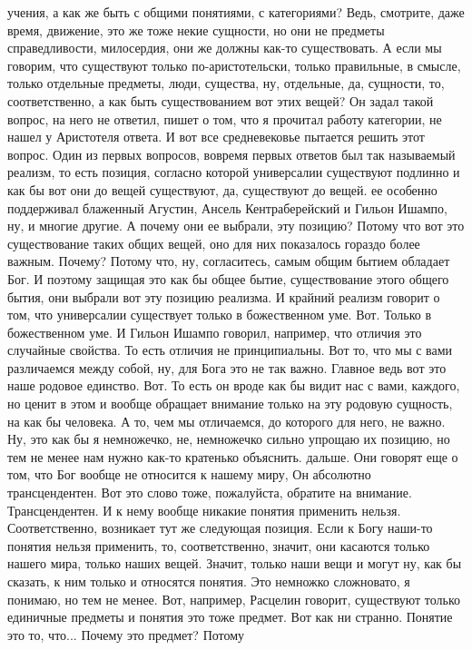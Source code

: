 учения, а как же быть с общими понятиями, с категориями? Ведь, смотрите, даже
время, движение, это же тоже некие сущности, но они не предметы справедливости,
милосердия, они же должны как-то существовать. А если мы говорим, что существуют
только по-аристотельски, только правильные, в смысле, только отдельные предметы,
люди, существа, ну, отдельные, да, сущности, то, соответственно, а как быть
существованием вот этих вещей? Он задал такой вопрос, на него не ответил, пишет
о том, что я прочитал работу категории, не нашел у Аристотеля ответа. И вот все
средневековье пытается решить этот вопрос. Один из первых вопросов, вовремя
первых ответов был так называемый реализм, то есть позиция, согласно которой
универсалии существуют подлинно и как бы вот они до вещей существуют, да,
существуют до вещей. ее особенно поддерживал блаженный Агустин, Ансель
Кентраберейский и Гильон Ишампо, ну, и многие другие. А почему они ее выбрали,
эту позицию? Потому что вот это существование таких общих вещей, оно для них
показалось гораздо более важным. Почему? Потому что, ну, согласитесь, самым
общим бытием обладает Бог. И поэтому защищая это как бы общее бытие,
существование этого общего бытия, они выбрали вот эту позицию реализма. И
крайний реализм говорит о том, что универсалии существует только в божественном
уме. Вот. Только в божественном уме. И Гильон Ишампо говорил, например, что
отличия это случайные свойства. То есть отличия не принципиальны. Вот то, что мы
с вами различаемся между собой, ну, для Бога это не так важно. Главное ведь вот
это наше родовое единство. Вот. То есть он вроде как бы видит нас с вами,
каждого, но ценит в этом и вообще обращает внимание только на эту родовую
сущность, на как бы человека. А то, чем мы отличаемся, до которого для него, не
важно. Ну, это как бы я немножечко, не, немножечко сильно упрощаю их позицию, но
тем не менее нам нужно как-то кратенько объяснить. дальше. Они говорят еще о
том, что Бог вообще не относится к нашему миру, Он абсолютно трансцендентен. Вот
это слово тоже, пожалуйста, обратите на внимание. Трансцендентен. И к нему
вообще никакие понятия применить нельзя. Соответственно, возникает тут же
следующая позиция. Если к Богу наши-то понятия нельзя применить, то,
соответственно, значит, они касаются только нашего мира, только наших вещей.
Значит, только наши вещи и могут ну, как бы сказать, к ним только и относятся
понятия. Это немножко сложновато, я понимаю, но тем не менее. Вот, например,
Расцелин говорит, существуют только единичные предметы и понятия это тоже
предмет. Вот как ни странно. Понятие это то, что... Почему это предмет? Потому
